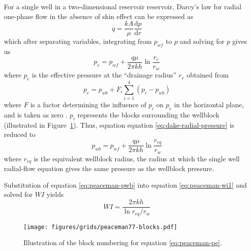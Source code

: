 For a single well in a two-dimensional reservoir reservoir, Darcy's law for radial one-phase flow in the absence of skin effect can be expressed as
\begin{equation}
    q = \frac{kA}{\mu} \frac{\mathrm{d}p}{\mathrm{d}r}
\end{equation}
which after separating variables, integrating from $p_{wf}$ to $p$ and solving for $p$ gives us
\begin{equation}
    \label{eq:dake-radial-pressure}
    p_e = p_{wf} + \frac{q\mu}{2\pi kh} \ln{\frac{r_e}{r_w}}
\end{equation}
where $p_e$ is the effective pressure at the ``drainage radius'' $r_e$ \cite{Dake1978Developments} obtained from
\begin{equation}
    \label{eq:peaceman-pe}
    p_e = p_{wb} + F_i \sum_{i=1}^{4}\left( p_i - p_{wb} \right)
\end{equation}
where $F$ is a factor determining the influence of $p_i$ on $p_e$ in the horizontal plane, and is taken as zero \cite{Schwabe1967Prediction,Peaceman1978Interpretation}. $p_i$ represents the blocks surrounding the wellblock (illustrated in Figure~\ref{fig:peaceman-block-numbering}). Thus, equation equation \eqref{eq:dake-radial-pressure} is reduced to
\begin{equation}
    \label{eq:peaceman-pwb}
    p_{wb} = p_{wf} + \frac{q\mu}{2\pi kh} \ln{\frac{r_{eq}}{r_w}}
\end{equation}
where $r_{eq}$ is the equivalent wellblock radius, the radius at which the single well radial-flow equation gives the same pressure as the wellblock pressure\cite{Peaceman1978Interpretation,Peaceman2003New}.

Substitution of equation \eqref{eq:peaceman-pwb} into equation \eqref{eq:peaceman-wi1} and solved for $WI$ yields
\begin{equation}
    \label{eq:peaceman-wi2}
    WI = \frac{2\pi kh}{\ln{r_{eq}/r_w}}
\end{equation}

\begin{figure}[htbp]
    \centering
    \texttt{[image: figures/grids/peaceman77-blocks.pdf]}
    \caption{Illustration of the block numbering for equation \eqref{eq:peaceman-pe}.}
    \label{fig:peaceman-block-numbering}
\end{figure}

